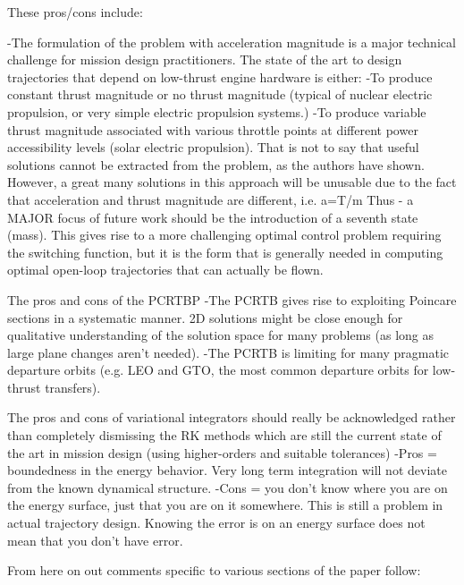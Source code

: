 \documentclass[11pt]{article}
\begin{document}
These pros/cons include:

-The formulation of the problem with acceleration magnitude is a major technical challenge for mission design practitioners.  The state of the art to design trajectories that depend on low-thrust engine hardware is either:
-To produce constant thrust magnitude or no thrust magnitude (typical of nuclear electric propulsion, or very simple electric propulsion systems.)
-To produce variable thrust magnitude associated with various throttle points at different power accessibility levels (solar electric propulsion).
That is not to say that useful solutions cannot be extracted from the problem, as the authors have shown.  However, a great many solutions in this approach will be unusable due to the fact that acceleration and thrust magnitude are different, i.e. a=T/m
Thus - a MAJOR focus of future work should be the introduction of a seventh state (mass).  This gives rise to a more challenging optimal control problem requiring the switching function, but it is the form that is generally needed in computing optimal open-loop trajectories that can actually be flown.

The pros and cons of the PCRTBP
-The PCRTB gives rise to exploiting Poincare sections in a systematic manner.  2D solutions might be close enough for qualitative understanding of the solution space for many problems (as long as large plane changes aren't needed).
-The PCRTB is limiting for many pragmatic departure orbits (e.g. LEO and GTO, the most common departure orbits for low-thrust transfers).


The pros and cons of variational integrators should really be acknowledged rather than completely dismissing the RK methods which are still the current state of the art in mission design (using higher-orders and suitable tolerances)
-Pros = boundedness in the energy behavior.  Very long term integration will not deviate from the known dynamical structure.
-Cons = you don't know where you are on the energy surface, just that you are on it somewhere.  This is still a problem in actual trajectory design.  Knowing the error is on an energy surface does not mean that you don't have error.

From here on out comments specific to various sections of the paper follow:
\end{document}
